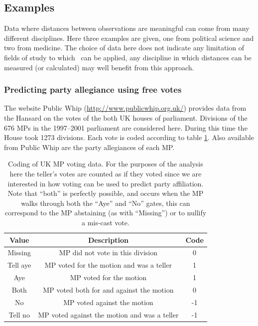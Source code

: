 \subsection{Examples}
\label{gds-examples}

Data where distances between observations are meaningful can come from many different disciplines. Here three examples are given, one from political science and two from medicine. The choice of data here does not indicate any limitation of fields of study to which \mdsds\ can be applied, any discipline in which distances can be measured (or calculated) may well benefit from this approach.

\subsubsection{Predicting party allegiance using free votes}

\label{cor-r53}The website Public Whip (\url{http://www.publicwhip.org.uk/}) provides data from the Hansard on the votes of the both UK houses of parliament. Divisions of the 676 MPs in the 1997--2001 parliament are considered here. During this time the House took 1273 divisions. Each vote is coded according to table \ref{voting-code}. Also available from Public Whip are the party allegiances of each MP. 

\begin{table}  
\begin{centering}
\begin{tabular}{ccc}
    Value & Description & Code \\ 
    \hline
    Missing & MP did not vote in this division & 0 \\ 
    Tell aye & MP voted for the motion and was a teller & 1 \\ 
    Aye & MP voted for the motion & 1 \\ 
    Both & MP voted both for  and against the motion & 0 \\ 
    No & MP voted against the motion & -1 \\ 
    Tell no & MP voted against the motion and was a teller & -1 \\ 
  \end{tabular}
\caption{Coding of UK MP voting data. For the purposes of the analysis here the teller's votes are counted as if they voted since we are interested in how voting can be used to predict party affiliation. Note that ``both'' is perfectly possible, and occurs when the MP walks through both the ``Aye'' and ``No'' gates, this can correspond to the MP abstaining (as with ``Missing'') or to nullify a mis-cast vote.}
\label{voting-code}
\end{centering}
\end{table}

